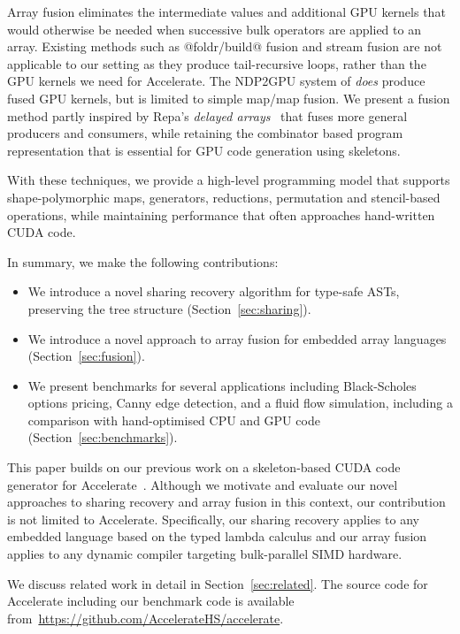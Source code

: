 Array fusion eliminates the intermediate values and additional GPU kernels that would otherwise be needed when successive bulk operators are applied to an array. Existing methods such as @foldr/build@ fusion \cite{Gill:1993de} and stream fusion \cite{Coutts:stream-fusion} are not applicable to our setting as they produce tail-recursive loops, rather than the GPU kernels we need for Accelerate. The NDP2GPU system of \cite{bergstrom:ndp2gpu} \emph{does} produce fused GPU kernels, but is limited to simple map/map fusion. We present a fusion method partly inspired by Repa's \emph{delayed arrays}~\cite{Keller:Repa} that fuses more general producers and consumers, while retaining the combinator based program representation that is essential for GPU code generation using skeletons.

With these techniques, we provide a high-level programming model that supports shape-polymorphic maps, generators, reductions, permutation and stencil-based operations, while maintaining performance that often approaches hand-written CUDA code.

In summary, we make the following contributions:
%
\begin{itemize}
\item We introduce a novel sharing recovery algorithm for type-safe ASTs, preserving the tree structure (Section~\ref{sec:sharing}).
\item We introduce a novel approach to array fusion for embedded array languages (Section~\ref{sec:fusion}).
\item We present benchmarks for several applications including Black-Scholes options pricing, Canny edge detection, and a fluid flow simulation, including a comparison with hand-optimised CPU and GPU code (Section~\ref{sec:benchmarks}).
\end{itemize}
%
This paper builds on our previous work on a skeleton-based CUDA code generator for Accelerate~\cite{Chakravarty:Accelerate}. Although we motivate and evaluate our novel approaches to sharing recovery and array fusion in this context, our contribution is not limited to Accelerate. Specifically, our sharing recovery applies to any embedded language based on the typed lambda calculus and our array fusion applies to any dynamic compiler targeting bulk-parallel SIMD hardware.

We discuss related work in detail in Section~\ref{sec:related}. The source code for Accelerate including our benchmark code is available \mbox{from \url{https://github.com/AccelerateHS/accelerate}}.


